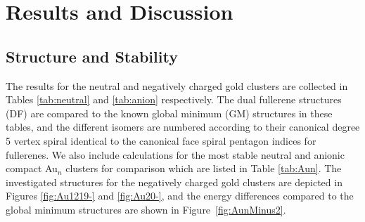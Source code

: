 \section{\label{sec:ResDis}Results and Discussion}
\subsection{Structure and Stability}

The results for the neutral and negatively charged gold clusters are collected in
Tables \ref{tab:neutral} and \ref{tab:anion} respectively. The dual fullerene
structures (DF) are compared to the known global minimum (GM) structures in
these tables, and the different isomers are numbered according to their
canonical degree 5 vertex spiral identical to the canonical face spiral
pentagon indices for fullerenes.\autocite{Fowler-atlas-2006} We also include
calculations for the most stable neutral and anionic compact Au$_n$
clusters for comparison which are listed in Table \ref{tab:Aun}. The
investigated structures for the
negatively charged gold clusters are depicted in Figures \ref{fig:Au1219-} and
\ref{fig:Au20-}, and the energy differences compared to the global minimum structures
are shown in Figure~\ref{fig:AunMinus2}.


